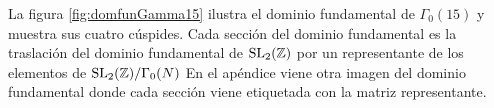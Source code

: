 La figura \ref{fig:domfunGamma15} ilustra el dominio fundamental de $\Gamma_0(15)$ y muestra sus
cuatro c\'uspides. Cada secci\'on del dominio fundamental es la traslaci\'on del dominio
fundamental de $\mathrm{SL}_2(\mathbb{Z})$ por un representante de los elementos de $\mathrm{SL}_2(\mathbb{Z})/\Gamma_0(N)$
En el ap\'endice viene otra imagen del dominio fundamental donde cada secci\'on viene
etiquetada con la matriz representante.


